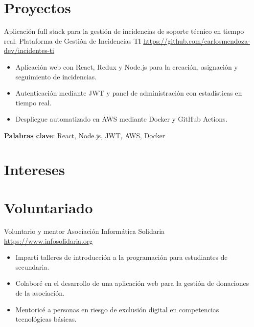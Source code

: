 \documentclass[a4paper, serif, 10pt]{moderncv}
\begin{document}
\section{Proyectos}

        {Aplicación full stack para la gestión de incidencias de soporte técnico en tiempo real.}
        {Plataforma de Gestión de Incidencias TI}
        {\url{https://github.com/carlosmendoza-dev/incidentes-ti}}
        {}
        {\begin{itemize}
\item Aplicación web con React, Redux y Node.js para la creación, asignación y seguimiento de incidencias.
\item Autenticación mediante JWT y panel de administración con estadísticas en tiempo real.
\item Despliegue automatizado en AWS mediante Docker y GitHub Actions.
\end{itemize}
\textbf{Palabras clave}: React, Node.js, JWT, AWS, Docker}
\section{Intereses}

\section{Voluntariado}

        {Voluntario y mentor}
        {Asociación Informática Solidaria}
        {\url{https://www.infosolidaria.org}}
        {}
        {\begin{itemize}
\item Impartí talleres de introducción a la programación para estudiantes de secundaria.
\item Colaboré en el desarrollo de una aplicación web para la gestión de donaciones de la asociación.
\item Mentoricé a personas en riesgo de exclusión digital en competencias tecnológicas básicas.
\end{itemize}}
    
\end{document}
